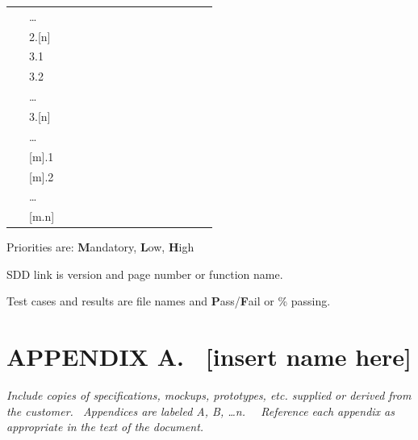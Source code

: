 \documentclass[twoside,letterpaper]{article}
\begin{document}
\begin{flushleft}
\begin{supertabular}{m{0.9212598in}|m{0.42125985in}|m{1.9212599in}|m{0.39275986in}|m{0.7587598in}|m{0.6622598in}|m{0.5462598in}|m{0.6712598in}|m{0.6087598in}|m{0.6712598in}|m{0.6295598in}|}
 &
\centering {}\color{black} {\dots} &
~
 &
~
 &
~
 &
~
 &
~
 &
~
 &
~
 &
~
 &
~
\\\hhline{~----------}
 &
\centering {}\color{black} 2.[n] &
~
 &
~
 &
~
 &
~
 &
~
 &
~
 &
~
 &
~
 &
~
\\\hhline{~----------}
 &
\centering {}\color{black} 3.1 &
~
 &
~
 &
~
 &
~
 &
~
 &
~
 &
~
 &
~
 &
~
\\\hline
 &
\centering {}\color{black} 3.2 &
~
 &
~
 &
~
 &
~
 &
~
 &
~
 &
~
 &
~
 &
~
\\\hhline{~----------}
 &
\centering {}\color{black} {\dots} &
~
 &
~
 &
~
 &
~
 &
~
 &
~
 &
~
 &
~
 &
~
\\\hhline{~----------}
 &
\centering {}\color{black} 3.[n] &
~
 &
~
 &
~
 &
~
 &
~
 &
~
 &
~
 &
~
 &
~
\\\hhline{~----------}
 &
\centering {}\color{black} {\dots} &
~
 &
~
 &
~
 &
~
 &
~
 &
~
 &
~
 &
~
 &
~
\\\hline
{} &
\centering {}\color{black} [m].1 &
~
 &
~
 &
~
 &
~
 &
~
 &
~
 &
~
 &
~
 &
~
\\\hline
 &
\centering {}\color{black} [m].2 &
~
 &
~
 &
~
 &
~
 &
~
 &
~
 &
~
 &
~
 &
~
\\\hhline{~----------}
 &
\centering {}\color{black} {\dots} &
~
 &
~
 &
~
 &
~
 &
~
 &
~
 &
~
 &
~
 &
~
\\\hline
{} &
\centering {}\color{black} [m.n] &
~
 &
~
 &
~
 &
~
 &
~
 &
~
 &
~
 &
~
 &
~
\\\hline
\end{supertabular}
\end{flushleft}
{\color{black}
Priorities are: \textbf{M}andatory, \textbf{L}ow, \textbf{H}igh}

{\color{black}
SDD link is version and page number or function name.}

{\color{black}
Test cases and results are file names and \textbf{P}ass/\textbf{F}ail or
\% passing.}

\clearpage\setcounter{page}{1}\pagestyle{Convertviii}
\section[APPENDIX A. \ [insert name
here{]}]{\bfseries\color{black} APPENDIX A.
\ [insert name here]}
{\itshape\color{black}
Include copies of specifications, mockups, prototypes, etc. supplied or
derived from the customer. \ Appendices are labeled A, B, {\dots}n.
\ \ Reference each appendix as appropriate in the text of the document.
}
\end{document}
